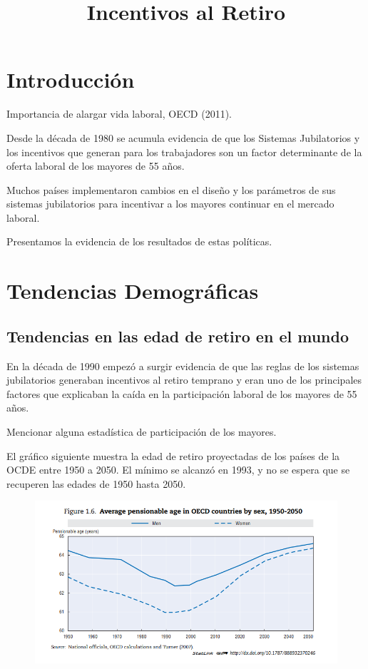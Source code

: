 \documentclass[]{article}
\title{Incentivos al Retiro}
\author{}
\date{}
\begin{document}
\maketitle

{
\setcounter{tocdepth}{3}
\tableofcontents
}
\section{Introducción}\label{introduccion}

Importancia de alargar vida laboral, OECD (2011).

Desde la década de 1980 se acumula evidencia de que los Sistemas
Jubilatorios y los incentivos que generan para los trabajadores son un
factor determinante de la oferta laboral de los mayores de 55 años.

Muchos países implementaron cambios en el diseño y los parámetros de sus
sistemas jubilatorios para incentivar a los mayores continuar en el
mercado laboral.

Presentamos la evidencia de los resultados de estas políticas.

\section{Tendencias Demográficas}\label{tendencias-demograficas}

\subsection{Tendencias en las edad de retiro en el
mundo}\label{tendencias-en-las-edad-de-retiro-en-el-mundo}

En la década de 1990 empezó a surgir evidencia de que las reglas de los
sistemas jubilatorios generaban incentivos al retiro temprano y eran uno
de los principales factores que explicaban la caída en la participación
laboral de los mayores de 55 años.

Mencionar alguna estadística de participación de los mayores.

El gráfico siguiente muestra la edad de retiro proyectadas de los países
de la OCDE entre 1950 a 2050. El mínimo se alcanzó en 1993, y no se
espera que se recuperen las edades de 1950 hasta 2050.

\begin{figure}
\centering
\includegraphics{imgs/pensions-glance-fig1.6.png}
\caption{}
\end{figure}
\end{document}

